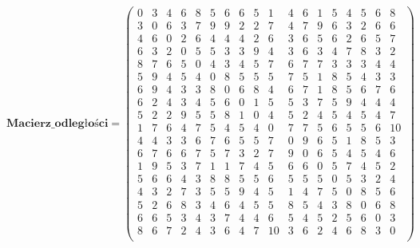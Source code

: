 \par
$$
\mathbf{Macierz\_odległości} =
\left( \begin{array}{cccccccccccccccccc}
   0& 3& 4& 6& 8& 5& 6& 6& 5& 1& 4& 6& 1& 5& 4& 5& 6& 8\\
    3& 0& 6& 3& 7& 9& 9& 2& 2& 7& 4& 7& 9& 6& 3& 2& 6& 6\\
    4& 6& 0& 2& 6& 4& 4& 4& 2& 6& 3& 6& 5& 6& 2& 6& 5& 7\\
    6& 3& 2& 0& 5& 5& 3& 3& 9& 4& 3& 6& 3& 4& 7& 8& 3& 2\\
    8& 7& 6& 5& 0& 4& 3& 4& 5& 7& 6& 7& 7& 3& 3& 3& 4& 4\\
    5& 9& 4& 5& 4& 0& 8& 5& 5& 5& 7& 5& 1& 8& 5& 4& 3& 3\\
    6& 9& 4& 3& 3& 8& 0& 6& 8& 4& 6& 7& 1& 8& 5& 6& 7& 6\\
    6& 2& 4& 3& 4& 5& 6& 0& 1& 5& 5& 3& 7& 5& 9& 4& 4& 4\\
    5& 2& 2& 9& 5& 5& 8& 1& 0& 4& 5& 2& 4& 5& 4& 5& 4& 7\\
    1& 7& 6& 4& 7& 5& 4& 5& 4& 0& 7& 7& 5& 6& 5& 5& 6& 10\\
    4& 4& 3& 3& 6& 7& 6& 5& 5& 7& 0& 9& 6& 5& 1& 8& 5& 3\\
    6& 7& 6& 6& 7& 5& 7& 3& 2& 7& 9& 0& 6& 5& 4& 5& 4& 6\\
    1& 9& 5& 3& 7& 1& 1& 7& 4& 5& 6& 6& 0& 5& 7& 4& 5& 2\\
    5& 6& 6& 4& 3& 8& 8& 5& 5& 6& 5& 5& 5& 0& 5& 3& 2& 4\\
    4& 3& 2& 7& 3& 5& 5& 9& 4& 5& 1& 4& 7& 5& 0& 8& 5& 6\\
    5& 2& 6& 8& 3& 4& 6& 4& 5& 5& 8& 5& 4& 3& 8& 0& 6& 8\\
    6& 6& 5& 3& 4& 3& 7& 4& 4& 6& 5& 4& 5& 2& 5& 6& 0& 3\\
    8& 6& 7& 2& 4& 3& 6& 4& 7& 10& 3& 6& 2& 4& 6& 8& 3& 0\\
\end{array} \right)
$$

\par
